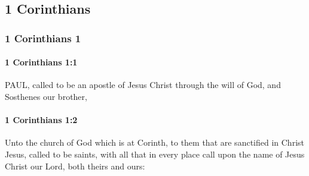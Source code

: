 \subsection{1 Corinthians}
	\label{1CORINTHIANS}

	\subsubsection{1 Corinthians 1} %
		\label{1CORINTHIANS-1}
		
		\paragraph{1 Corinthians 1:1} %
			\label{1CORINTHIANS-1-1}

			PAUL, called to be an apostle of Jesus Christ through the will of God, and Sosthenes our brother,

			\begin{framed}
			\scriptsize
				\begin{compactdesc}
					\item[SBLG] 
				\end{compactdesc}
			\end{framed}

		\paragraph{1 Corinthians 1:2} %
			\label{1CORINTHIANS-1-2}

			Unto the church of God which is at Corinth, to them that are sanctified in Christ Jesus, called to be saints, with all that in every place call upon the name of Jesus Christ our Lord, both theirs and ours:

